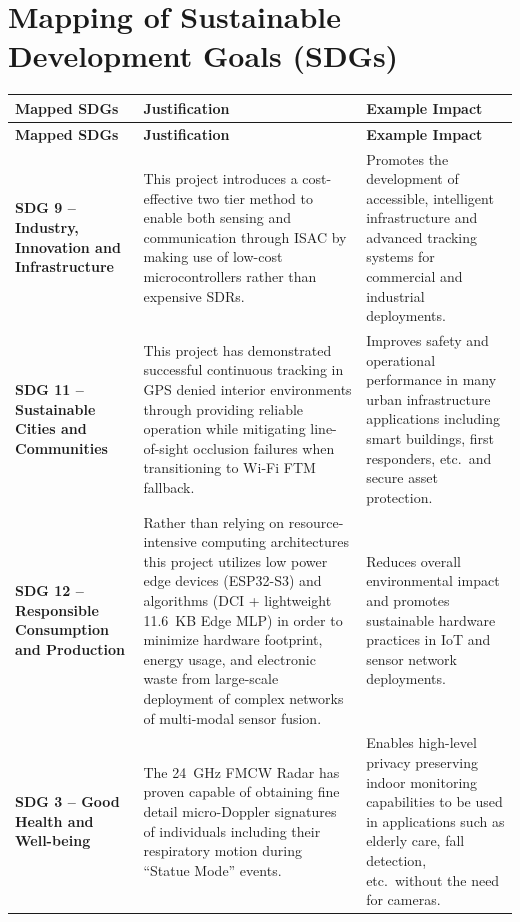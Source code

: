 {}
\chapter*{Mapping of Sustainable Development Goals (SDGs)}
\thispagestyle{plain}

\vspace{0.5cm}

\noindent
\begin{longtable}{@{}|p{3.8cm}|p{5.2cm}|p{5.2cm}|@{}}
\hline
\rowcolor[gray]{0.85}
\textbf{Mapped SDGs} & \textbf{Justification} & \textbf{Example Impact} \\
\hline
\endfirsthead

\hline
\rowcolor[gray]{0.85}
\textbf{Mapped SDGs} & \textbf{Justification} & \textbf{Example Impact} \\
\hline
\endhead

\textbf{SDG 9 -- Industry, Innovation and Infrastructure} &
This project introduces a cost-effective two tier method to enable both sensing and communication through ISAC by making use of low-cost microcontrollers rather than expensive SDRs. &
Promotes the development of accessible, intelligent infrastructure and advanced tracking systems for commercial and industrial deployments. \\
\hline

\textbf{SDG 11 -- Sustainable Cities and Communities} &
This project has demonstrated successful continuous tracking in GPS denied interior environments through providing reliable operation while mitigating line-of-sight occlusion failures when transitioning to Wi-Fi FTM fallback. &
Improves safety and operational performance in many urban infrastructure applications including smart buildings, first responders, etc.\ and secure asset protection. \\
\hline

\textbf{SDG 12 -- Responsible Consumption and Production} &
Rather than relying on resource-intensive computing architectures this project utilizes low power edge devices (ESP32-S3) and algorithms (DCI + lightweight 11.6~KB Edge MLP) in order to minimize hardware footprint, energy usage, and electronic waste from large-scale deployment of complex networks of multi-modal sensor fusion. &
Reduces overall environmental impact and promotes sustainable hardware practices in IoT and sensor network deployments. \\
\hline

\textbf{SDG 3 -- Good Health and Well-being} &
The 24~GHz FMCW Radar has proven capable of obtaining fine detail micro-Doppler signatures of individuals including their respiratory motion during ``Statue Mode'' events. &
Enables high-level privacy preserving indoor monitoring capabilities to be used in applications such as elderly care, fall detection, etc.\ without the need for cameras. \\
\hline

\end{longtable}
